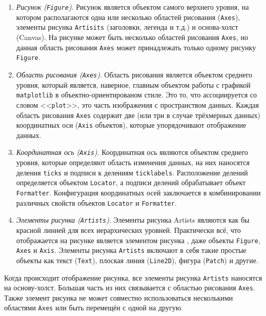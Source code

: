 \begin{enumerate}[label=\arabic*)]
	\item  \textit{Рисунок (\lstinline!Figure!)}. Рисунок является объектом самого верхнего уровня, на котором располагаются одна или несколько областей рисования (\lstinline!Axes!), элементы рисунка \lstinline!Artisits! (заголовки, легенда и т.д.) и основа-холст (Canvas). На рисунке может быть несколько областей рисования \lstinline!Axes!, но данная область рисования \lstinline!Axes! может принадлежать только одному рисунку \lstinline!Figure!.
	\item  \textit{Область рисования (\lstinline!Axes!)}. Область рисования является объектом среднего уровня, который является, наверное, главным объектом работы с графикой \lstinline!matplotlib! в объектно-ориентированом стиле. Это то, что ассоциируется со словом <<\lstinline!plot!>>, это часть изображения с пространством данных. Каждая область рисования \lstinline!Axes! содержит две (или три в случае трёхмерных данных) координатных оси (\lstinline!Axis! объектов), которые упорядочивают отображение данных.
	\item  \textit{Координатная ось (\lstinline!Axis!)}. Координатная ось являются объектом среднего уровня, которые определяют область изменения данных, на них наносятся деления \lstinline!ticks! и подписи к делениям \lstinline!ticklabels!. Расположение делений определяется объектом \lstinline!Locator!, а подписи делений обрабатывает объект \lstinline!Formatter!. Конфигурация координатных осей заключается в комбинировании различных свойств объектов \lstinline!Locator! и \lstinline!Formatter!.
	\item  \textit{Элементы рисунка (\lstinline!Artists!)}. Элементы рисунка Artists являются как бы красной линией для всех иерархических уровней. Практически всё, что отображается на рисунке является элементом рисунка , даже объекты \lstinline!Figure!, \lstinline!Axes! и \lstinline!Axis!. Элементы рисунка \lstinline!Artists! включают в себя такие простые объекты как текст (\lstinline!Text!), плоская линия (\lstinline!Line2D!), фигура (\lstinline!Patch!) и другие.
\end{enumerate}

Когда происходит отображение рисунка, все элементы рисунка \lstinline!Artists! наносятся на основу-холст. Большая часть из них связывается с областью рисования \lstinline!Axes!. Также элемент рисунка не может совместно использоваться несколькими областями \lstinline!Axes! или быть перемещён с одной на другую.


